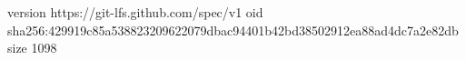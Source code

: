 version https://git-lfs.github.com/spec/v1
oid sha256:429919c85a538823209622079dbac94401b42bd38502912ea88ad4dc7a2e82db
size 1098

